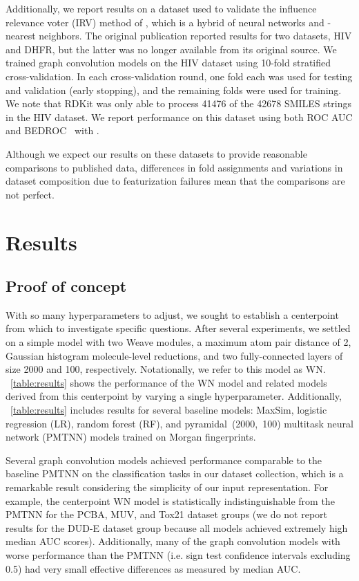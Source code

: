 Additionally, we report results on a dataset used to validate the influence
relevance voter (IRV) method of \citet{swamidass2009influence}, which is a
hybrid of neural networks and -nearest neighbors. The original publication
reported results for two datasets, HIV and DHFR, but the latter was no longer
available from its original source. We trained graph convolution models on the
HIV dataset using 10-fold stratified cross-validation. In each cross-validation
round, one fold each was used for testing and validation (early stopping), and
the remaining folds were used for training. We note that RDKit was only able to
process \num{41476} of the \num{42678} SMILES strings in the HIV dataset.
We report performance on this dataset using both ROC AUC and
BEDROC~\citep{truchon2007evaluating} with .

Although we expect our results on these datasets to provide reasonable
comparisons to published data,  differences in fold assignments and variations
in dataset composition due to featurization failures mean that the comparisons
are not perfect.

\section{Results}
\label{sec:results}

\subsection{Proof of concept}

With so many hyperparameters to adjust, we sought to establish a centerpoint
from which to investigate specific questions. After several experiments, we
settled on a simple model with two Weave modules, a maximum atom pair distance
of 2, Gaussian histogram molecule-level reductions, and two fully-connected
layers of size 2000 and 100, respectively. Notationally, we refer to this model
as WN. \tablename~\ref{table:results} shows the performance of the
WN model and related models derived from this centerpoint by varying a
single hyperparameter. Additionally, \tablename~\ref{table:results} includes
results for several baseline models: MaxSim, logistic regression (LR), random
forest (RF), and pyramidal~(2000,~100) multitask neural network (PMTNN) models
trained on Morgan fingerprints.

Several graph convolution models achieved performance comparable to the baseline
PMTNN on the classification tasks in our dataset collection, which is a
remarkable result considering the simplicity of our input representation. For
example, the centerpoint WN model is statistically indistinguishable
from the PMTNN for the PCBA, MUV, and Tox21 dataset groups (we do not report
results for the DUD-E dataset group because all models achieved extremely high
median AUC scores). Additionally, many of the graph convolution models with
worse performance than the PMTNN (i.e. sign test confidence intervals
excluding 0.5) had very small effective differences as measured by median
AUC.


